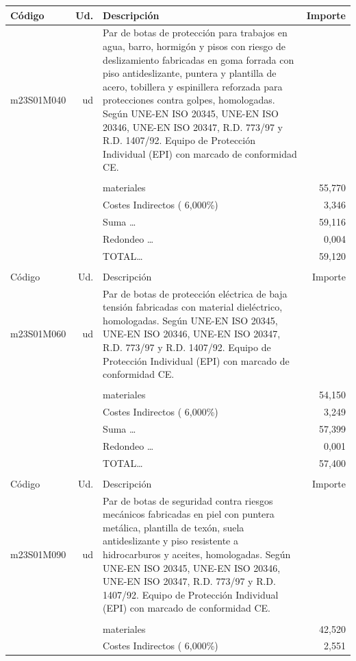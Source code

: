 \documentclass{book}%
\begin{document}
\begin{supertabular}{l r p{60mm} r}
Código&Ud.&Descripción&Importe\\%
\hline%
m23S01M040&ud&Par de botas de protección para trabajos en agua, barro, hormigón y pisos con riesgo de deslizamiento fabricadas en goma forrada con piso antideslizante, puntera y plantilla de acero, tobillera y espinillera reforzada para protecciones contra golpes, homologadas. Según UNE{-}EN ISO 20345, UNE{-}EN ISO 20346, UNE{-}EN ISO 20347, R.D. 773/97 y R.D. 1407/92. Equipo de Protección Individual (EPI) con marcado de conformidad CE.&\\%
&&&\\%
&&materiales&    55,770\\%
&&Costes Indirectos (     6,000\%)&     3,346\\%
&&Suma \ldots&    59,116\\%
&&Redondeo \ldots&     0,004\\%
%
&&TOTAL\ldots&    59,120\\%
&&&\\%
Código&Ud.&Descripción&Importe\\%
\hline%
m23S01M060&ud&Par de botas de protección eléctrica de baja tensión fabricadas con material dieléctrico, homologadas. Según UNE{-}EN ISO 20345, UNE{-}EN ISO 20346, UNE{-}EN ISO 20347, R.D. 773/97 y R.D. 1407/92. Equipo de Protección Individual (EPI) con marcado de conformidad CE.&\\%
&&&\\%
&&materiales&    54,150\\%
&&Costes Indirectos (     6,000\%)&     3,249\\%
&&Suma \ldots&    57,399\\%
&&Redondeo \ldots&     0,001\\%
%
&&TOTAL\ldots&    57,400\\%
&&&\\%
Código&Ud.&Descripción&Importe\\%
\hline%
m23S01M090&ud&Par de botas de seguridad contra riesgos mecánicos fabricadas en piel con puntera metálica, plantilla de texón, suela antideslizante y piso resistente a hidrocarburos y aceites, homologadas. Según UNE{-}EN ISO 20345, UNE{-}EN ISO 20346, UNE{-}EN ISO 20347, R.D. 773/97 y R.D. 1407/92. Equipo de Protección Individual (EPI) con marcado de conformidad CE.&\\%
&&&\\%
&&materiales&    42,520\\%
&&Costes Indirectos (     6,000\%)&     2,551\\%

\end{supertabular}
\end{document}

